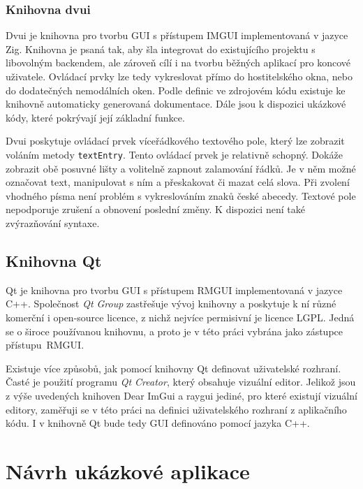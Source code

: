 \documentclass[FM,DP]{tulthesis}
\begin{document}
	\subsection{Knihovna dvui}
	
	Dvui \cite{online_dvui} je knihovna pro tvorbu GUI s přístupem IMGUI implementovaná v jazyce Zig. Knihovna je psaná tak, aby šla integrovat do existujícího projektu s libovolným backendem, ale zároveň cílí i na tvorbu běžných aplikací pro koncové uživatele. Ovládací prvky lze tedy vykreslovat přímo do hostitelského okna, nebo do dodatečných nemodálních oken. Podle definic ve zdrojovém kódu existuje ke knihovně automaticky generovaná dokumentace. Dále jsou k dispozici ukázkové kódy, které pokrývají její základní funkce.
	
	Dvui poskytuje ovládací prvek víceřádkového textového pole, který lze zobrazit voláním metody \texttt{textEntry}. Tento ovládací prvek je relativně schopný. Dokáže zobrazit obě posuvné lišty a volitelně zapnout zalamování řádků. Je v něm možné označovat text, manipulovat s ním a přeskakovat či mazat celá slova. Při zvolení vhodného písma není problém s vykreslováním znaků české abecedy. Textové pole nepodporuje zrušení a obnovení poslední změny. K dispozici není také zvýrazňování syntaxe. 
	
	\section{Knihovna Qt}
	
	Qt \cite{online_qt} je knihovna pro tvorbu GUI s přístupem RMGUI implementovaná v jazyce C++. Společnost \textit{Qt Group} zastřešuje vývoj knihovny a poskytuje k ní různé komerční i open-source licence, z nichž nejvíce permisivní je licence LGPL. Jedná se o široce používanou knihovnu, a proto je v této práci vybrána jako zástupce přístupu~\mbox{RMGUI}.
	
	Existuje více způsobů, jak pomocí knihovny Qt definovat uživatelské rozhraní. Časté je použití programu \textit{Qt Creator}, který obsahuje vizuální editor. Jelikož jsou z výše uvedených knihoven Dear ImGui a raygui jediné, pro které existují vizuální editory, zaměřuji se v této práci na definici uživatelského rozhraní z aplikačního kódu. I v knihovně Qt bude tedy GUI definováno pomocí jazyka C++.
	
	\chapter{Návrh ukázkové aplikace}\label{CH3}
	
\end{document}
